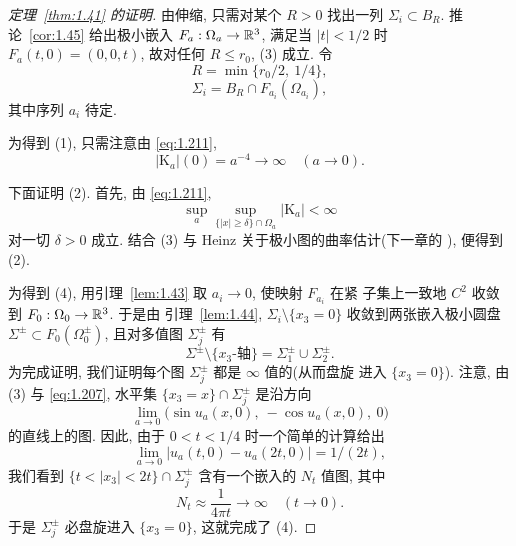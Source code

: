 \begin{proof}[定理~\ref{thm:1.41} 的证明]
由伸缩, 只需对某个 $R>0$ 找出一列 $\Sigma_i\subset B_R$.
推论~\ref{cor:1.45} 给出极小嵌入 $F_a:\Omega_a\to\mathbb{R}^3$, 满足当
$|t|<1/2$ 时 $F_a(t,0)=(0,0,t)$, 故对任何 $R\leq r_0$, (3) 成立. 令
\begin{equation}
R=\min\{r_0/2,\ 1/4\},
\label{eq:1.222}
\end{equation}
\begin{equation}
\Sigma_i=B_R\cap F_{a_i}(\Omega_{a_i}),
\label{eq:1.223}
\end{equation}
其中序列 $a_i$ 待定.

为得到 (1), 只需注意由 \eqref{eq:1.211},
\begin{equation}
|\mathrm{K}_a|(0)=a^{-4}\to\infty\quad(a\to0).
\label{eq:1.224}
\end{equation}

下面证明 (2). 首先, 由 \eqref{eq:1.211},
\begin{equation}
\sup_a\sup_{\{|x|\geq\delta\}\cap\Omega_a}
 |\mathrm{K}_a|<\infty
\label{eq:1.225}
\end{equation}
对一切 $\delta>0$ 成立. 结合 (3) 与 Heinz 关于极小图的曲率估计(下一章的
), 便得到 (2).

为得到 (4), 用引理~\ref{lem:1.43} 取 $a_i\to0$, 使映射 $F_{a_i}$ 在紧
子集上一致地 $C^{2}$ 收敛到 $F_0:\Omega_0\to\mathbb{R}^3$. 于是由
引理~\ref{lem:1.44}, $\Sigma_i\setminus\{x_3=0\}$ 收敛到两张嵌入极小圆盘
$\Sigma^{\pm}\subset F_0(\Omega_0^{\pm})$, 且对多值图 $\Sigma_j^{\pm}$ 有
\begin{equation}
\Sigma^{\pm}\setminus\{x_3\text{-轴}\}
 =\Sigma_1^{\pm}\cup\Sigma_2^{\pm}.
\label{eq:1.226}
\end{equation}
为完成证明, 我们证明每个图 $\Sigma_j^{\pm}$ 都是 $\infty$ 值的(从而盘旋
进入 $\{x_3=0\}$). 注意, 由 (3) 与 \eqref{eq:1.207}, 水平集
$\{x_3=x\}\cap\Sigma_j^{\pm}$ 是沿方向
\begin{equation}
\lim_{a\to0}\bigl(\sin u_a(x,0),\ -\cos u_a(x,0),\ 0\bigr)
\label{eq:1.227}
\end{equation}
的直线上的图. 因此, 由于 $0<t<1/4$ 时一个简单的计算给出
\begin{equation}
\lim_{a\to0}\bigl|u_a(t,0)-u_a(2t,0)\bigr|=1/(2t),
\label{eq:1.228}
\end{equation}
我们看到 $\{t<|x_3|<2t\}\cap\Sigma_j^{\pm}$ 含有一个嵌入的 $N_t$ 值图,
其中
\begin{equation}
N_t\approx\frac{1}{4\pi t}\to\infty\quad(t\to0).
\label{eq:1.229}
\end{equation}
于是 $\Sigma_j^{\pm}$ 必盘旋进入 $\{x_3=0\}$, 这就完成了 (4).
\end{proof}

